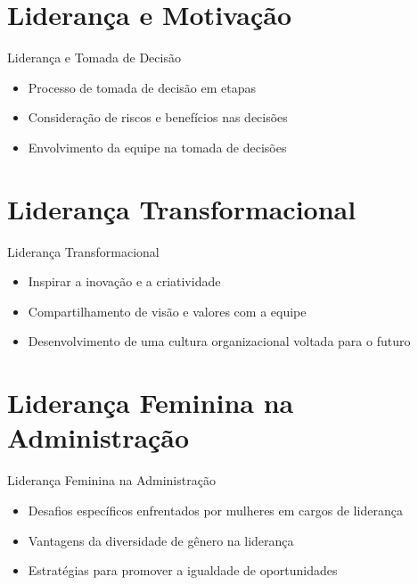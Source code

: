 \documentclass[aspectratio=169,xcolor=dvipsnames]{beamer}
\begin{document}
\section{Liderança e Motivação}

\begin{frame}{Liderança e Tomada de Decisão}
	\begin{itemize}
		\item Processo de tomada de decisão em etapas
		\item Consideração de riscos e benefícios nas decisões
		\item Envolvimento da equipe na tomada de decisões

	\end{itemize}
\end{frame}

\section{Liderança Transformacional}

\begin{frame}{Liderança Transformacional}
	\begin{itemize}
		\item Inspirar a inovação e a criatividade
		\item Compartilhamento de visão e valores com a equipe
		\item Desenvolvimento de uma cultura organizacional voltada para o futuro

	\end{itemize}
\end{frame}

\section{Liderança Feminina na Administração}

\begin{frame}{Liderança Feminina na Administração}
	\begin{itemize}
		\item Desafios específicos enfrentados por mulheres em cargos de liderança
		\item Vantagens da diversidade de gênero na liderança
		\item Estratégias para promover a igualdade de oportunidades

	\end{itemize}
\end{frame}
\end{document}
